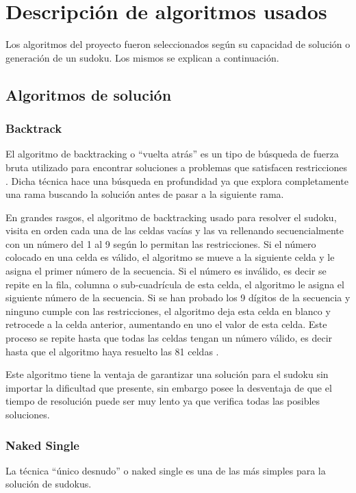 \documentclass[conference]{IEEEtran}
\begin{document}
\section{Descripción de algoritmos usados}
Los algoritmos del proyecto fueron seleccionados según su capacidad de solución o generación de un sudoku. Los mismos se explican a continuación.

\subsection{Algoritmos de solución}
\subsubsection{Backtrack}
El algoritmo de backtracking o “vuelta atrás” es un tipo de búsqueda de fuerza bruta utilizado para encontrar soluciones a problemas que satisfacen restricciones \cite{vueltaAtras}. Dicha técnica hace una búsqueda en profundidad ya que explora completamente una rama buscando la solución antes de pasar a la siguiente rama.

En grandes rasgos, el algoritmo de backtracking usado para resolver el sudoku, visita en orden cada una de las celdas vacías y las va rellenando secuencialmente con un número del 1 al 9 según lo permitan las restricciones. 
Si el número colocado en una celda es válido, el algoritmo se mueve a la siguiente celda y le asigna el primer número de la secuencia. Si el número es inválido, es decir se repite en la fila, columna o sub-cuadrícula de esta celda, el algoritmo le asigna el siguiente número de la secuencia. Si se han probado los 9 dígitos de la secuencia y ninguno cumple con las restricciones, el algoritmo deja esta celda en blanco y retrocede a la celda anterior, aumentando en uno el valor de esta celda. Este proceso se repite hasta que todas las celdas tengan un número válido, es decir hasta que el algoritmo haya resuelto las 81 celdas \cite{sudokuSolving}.

Este algoritmo tiene la ventaja de garantizar una solución para el sudoku sin importar la dificultad que presente, sin embargo posee la desventaja de que el tiempo de resolución puede ser muy lento ya que verifica todas las posibles soluciones.

\subsubsection{Naked Single}
La técnica “único desnudo” o naked single es una de las más simples para la solución de sudokus. 
\end{document}
